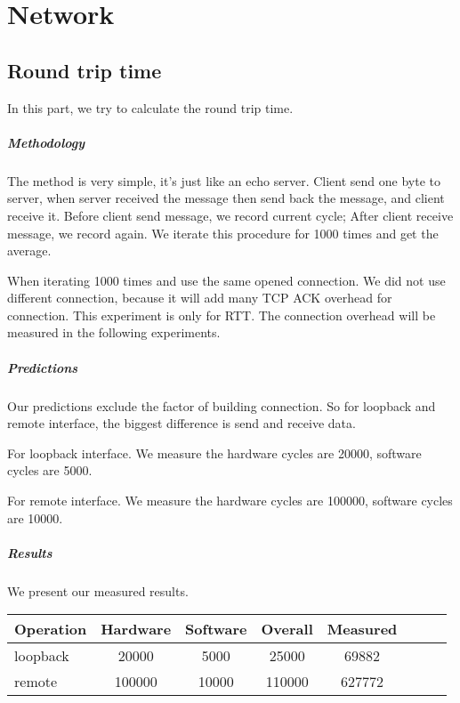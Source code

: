 \chapter{Network}

\section{Round trip time}
In this part, we try to calculate the round trip time.

\paragraph{Methodology}
The method is very simple, it's just like an echo server. Client send one byte to server, when server received the message then send back the message, and client receive it. Before client send message, we record current cycle; After client receive message, we record again. We iterate this procedure for 1000 times and get the average.

When iterating 1000 times and use the same opened connection. We did not use different connection, because it will add many TCP ACK overhead for connection. This experiment is only for RTT. The connection overhead will be measured in the following experiments.

\paragraph{Predictions}
Our predictions exclude the factor of building connection. So for loopback and remote interface, the biggest difference is send and receive data.

For loopback interface. We measure the hardware cycles are 20000, software cycles are 5000.

For remote interface. We measure the hardware cycles are 100000, software cycles are 10000.

\paragraph{Results}
We present our measured results.

\begin{center}
\begin{tabular}{l*{6}{c}r}
Operation       &  Hardware & Software & Overall & Measured\\
\hline
loopback & 20000 & 5000 & 25000 & 69882 \\
remote & 100000 & 10000& 110000 & 627772 \\
\end{tabular}
\end{center}

